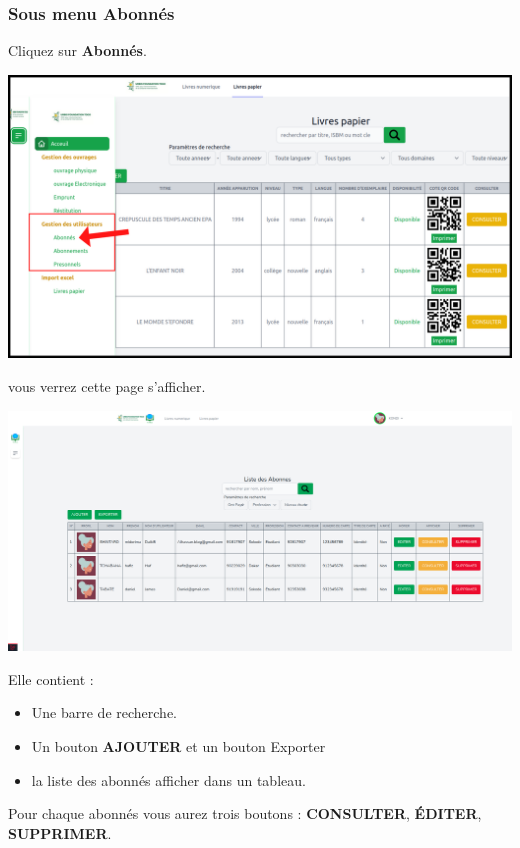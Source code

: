 \documentclass[12pt,a4paper]{article}
\begin{document}
\newpage
\subsubsection{Sous menu \textbf{Abonnés}}
Cliquez sur \textbf{Abonnés}.
\begin{center}
\includegraphics[scale=0.5]{img/abonne_menu.png}
\end{center}
vous verrez cette page s'afficher.\\
\begin{center}
\includegraphics[scale=0.3]{img/abonnes_liste.png}
\end{center}
Elle contient :
\begin{itemize}
\item Une barre de recherche.
\item Un bouton \textbf{AJOUTER} et un bouton Exporter
\item la liste des abonnés afficher dans un tableau.
\end{itemize}
Pour chaque abonnés vous aurez trois boutons : \textbf{CONSULTER}, \textbf{ÉDITER}, 
\textbf{SUPPRIMER}.\\
\end{document}
